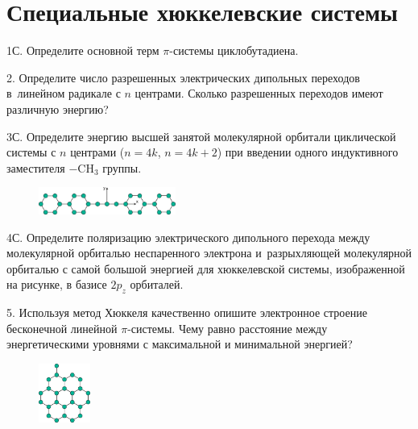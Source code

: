 \setmainfont{Noto Serif}
\setsansfont{Noto Sans}
\setmonofont{Noto Sans Mono}


\section{Специальные хюккелевские системы}

1С. Определите основной терм $\pi$-системы циклобутадиена.
\par
2. Определите число разрешенных электрических дипольных переходов в~линейном радикале с $n$ центрами. Сколько разрешенных переходов имеют различную энергию?
\par
3С. Определите энергию высшей занятой молекулярной орбитали циклической системы с $n$ центрами ($n = 4k$, $n = 4k + 2$) при введении одного индуктивного заместителя $-\text{CH}_3$ группы.
\par
\begin{figure} %
    \centering
    \vspace{-4mm}
    \includegraphics[width=45mm]{images/Fig_1_8_4.png}
    \vspace{-6mm}
\end{figure}
4С. Определите поляризацию электрического дипольного перехода между молекулярной орбиталью неспаренного электрона и~разрыхляющей молекулярной орбиталью с самой большой энергией для хюккелевской системы, изображенной на рисунке, в базисе $2p_z$ орбиталей.
\par
5. Используя метод Хюккеля качественно опишите электронное строение бесконечной линейной $\pi$-системы. Чему равно расстояние между энергетическими уровнями с максимальной и минимальной энергией?
\par
\begin{figure} %
    \centering
    \vspace{-7mm}
    \includegraphics[width=17mm]{images/Fig_1_8_6.png}
    \vspace{-8mm}
\end{figure}
